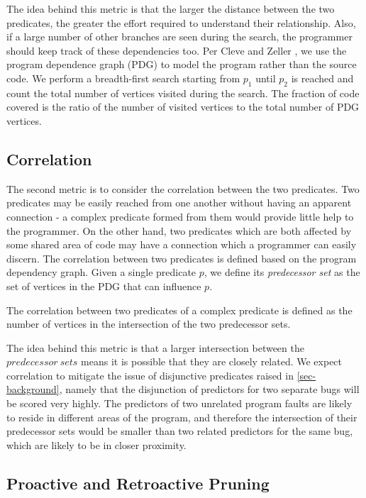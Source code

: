 The idea behind this metric is that the larger the distance between the two predicates, the greater the effort required to understand their relationship.  Also, if a large number of other branches are seen during the search, the programmer should keep track of these dependencies too.  Per Cleve and Zeller \cite{1062522}, we use the program dependence graph (PDG) to model the program rather than the source code.  We perform a breadth-first search starting from $p_1$ until $p_2$ is reached and count the total number of vertices visited during the search. The fraction of code covered is the ratio of the number of visited vertices to the total number of PDG vertices. 

\subsection{Correlation}

The second metric is to consider the correlation between the two predicates.  Two predicates may be easily reached from one another without having an apparent connection - a complex predicate formed from them would provide little help to the programmer.  On the other hand, two predicates which are both affected by some shared area of code may have a connection which a programmer can easily discern.  The correlation between two predicates is defined based on the program dependency graph.  Given a single predicate $p$, we define its \textit{predecessor set} as the set of vertices in the PDG that can influence $p$.

\begin{defn}
\label{dfn5}
The correlation between two predicates of a complex predicate is defined as the number of vertices in the intersection of the two predecessor sets.
\end{defn}

The idea behind this metric is that a larger intersection between the $predecessor\ sets$ means it is possible that they are closely related.  We expect correlation to mitigate the issue of disjunctive predicates raised in \autoref{sec-background}, namely that the disjunction of predictors for two separate bugs will be scored very highly.  The predictors of two unrelated program faults are likely to reside in different areas of the program, and therefore the intersection of their predecessor sets would be smaller than two related predictors for the same bug, which are likely to be in closer proximity.

\subsection{Proactive and Retroactive Pruning}

